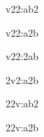 \documentclass[a4paper]{article}
\begin{document}
\makeatletter


\pgfplotspointonorientedsurfaceabmatchaxisline@ v22:ab2\pgfplots@EOI%

\pgfplotspointonorientedsurfaceabmatchaxisline@ v22:a2b\pgfplots@EOI%

\pgfplotspointonorientedsurfaceabmatchaxisline@ v22:2ab\pgfplots@EOI%
\pgfplotsassertequalstok{}{\pgfplots@loc@TMPa}{}



\pgfplotspointonorientedsurfaceabmatchaxisline@ 2v2:a2b\pgfplots@EOI%
\pgfplotsassertequalstok{}{\pgfplots@loc@TMPa}{}

\pgfplotspointonorientedsurfaceabmatchaxisline@ 22v:ab2\pgfplots@EOI%
\pgfplotsassertequalstok{}{\pgfplots@loc@TMPa}{}

\pgfplotspointonorientedsurfaceabmatchaxisline@ 22v:a2b\pgfplots@EOI%
\end{document}
